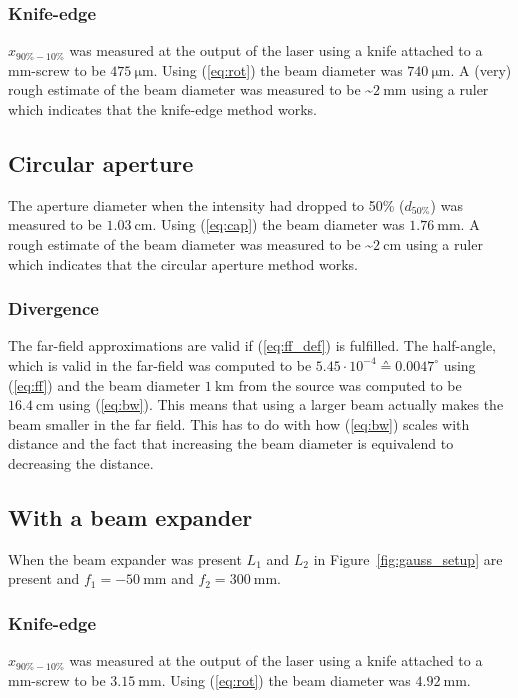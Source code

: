 \documentclass[12pt,a4paper]{article}
\begin{document}
\subsubsection{Knife-edge}
$x_{90\%-10\%}$ was measured at the output of the laser using a knife attached to a mm-screw to be $\SI{475}{\micro\metre}$. Using (\ref{eq:rot}) the beam diameter was $\SI{740}{\micro\metre}$. A (very) rough estimate of the beam diameter was measured to be \textasciitilde$\SI{2}{\milli\metre}$ using a ruler which indicates that the knife-edge method works.
\subsection{Circular aperture}
The aperture diameter when the intensity had dropped to 50\% ($d_{50\%}$) was measured to be $\SI{1.03}{\centi\metre}$. Using (\ref{eq:cap}) the beam diameter was $\SI{1.76}{\milli\metre}$. A rough estimate of the beam diameter was measured to be \textasciitilde$\SI{2}{\centi\metre}$ using a ruler which indicates that the circular aperture method works.
\subsubsection{Divergence}
The far-field approximations are valid if (\ref{eq:ff_def}) is fulfilled. The half-angle, which is valid in the far-field was computed to be $5.45\cdot 10^{-4}\corresponds 0.0047^\circ$ using (\ref{eq:ff}) and the beam diameter $\SI{1}{\kilo\metre}$ from the source was computed to be $\SI{16.4}{\centi\metre}$ using (\ref{eq:bw}). This means that using a larger beam actually makes the beam smaller in the far field. This has to do with how (\ref{eq:bw}) scales with distance and the fact that increasing the beam diameter is equivalend to decreasing the distance.

\subsection{With a beam expander}
When the beam expander was present $L_1$ and $L_2$ in Figure~\ref{fig:gauss_setup} are present and $f_1=\SI{-50}{\milli\metre}$ and $f_2=\SI{300}{\milli\metre}$.
\subsubsection{Knife-edge}
$x_{90\%-10\%}$ was measured at the output of the laser using a knife attached to a mm-screw to be $\SI{3.15}{\milli\metre}$. Using (\ref{eq:rot}) the beam diameter was $\SI{4.92}{\milli\metre}$.
\end{document}
